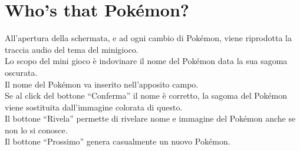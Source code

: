 \documentclass[a4paper,11pt]{article}
\begin{document}
\section{Who’s that Pokémon?}
  All’apertura della schermata, e ad ogni cambio di Pokémon, viene riprodotta la traccia audio del tema del minigioco.\\
Lo scopo del mini gioco è indovinare il nome del Pokémon data la sua sagoma oscurata.\\
Il nome del Pokémon va inserito nell’apposito campo.\\
Se al click del bottone “Conferma” il nome è corretto, la sagoma del Pokémon viene sostituita dall’immagine colorata di questo.\\
Il bottone “Rivela” permette di rivelare nome e immagine del Pokémon anche se non lo si conosce.\\
Il bottone “Prossimo” genera casualmente un nuovo Pokémon.\\
\end{document}
